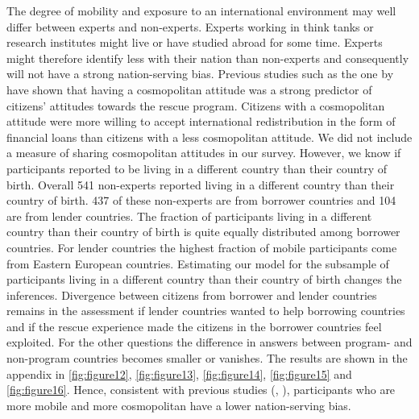 The degree of mobility and exposure to an international environment may well differ between experts and non-experts. Experts working in think tanks or research institutes might live or have studied abroad for some time. Experts might therefore identify less with their nation than non-experts and consequently will not have a strong nation-serving bias. Previous studies such as the one by \cite{bechtel} have shown that having a cosmopolitan attitude was a strong predictor of citizens' attitudes towards the rescue program. Citizens with a cosmopolitan attitude were more willing to accept international redistribution in the form of financial loans than citizens with a less cosmopolitan attitude. We did not include a measure of sharing cosmopolitan attitudes in our survey. However, we know if participants reported to be living in a different country than their country of birth. Overall 541 non-experts reported living in a different country than their country of birth. 437 of these non-experts are from borrower countries and 104 are from lender countries. The fraction of participants living in a different country than their country of birth is quite equally distributed among borrower countries. For lender countries the highest fraction of mobile participants come from Eastern European countries. Estimating our model for the subsample of participants living in a different country than their country of birth changes the inferences. Divergence between citizens from borrower and lender countries remains in the assessment if lender countries wanted to help borrowing countries and if the rescue experience made the citizens in the borrower countries feel exploited. For the other questions the difference in answers between program- and non-program countries becomes smaller or vanishes. The results are shown in the appendix in \autoref{fig:figure12}, \autoref{fig:figure13}, \autoref{fig:figure14},  \autoref{fig:figure15} and \autoref{fig:figure16}. Hence, consistent with previous studies (\citep{bechtel}, \citep{kuhn}), participants who are more mobile and more cosmopolitan have a lower nation-serving bias.\\
